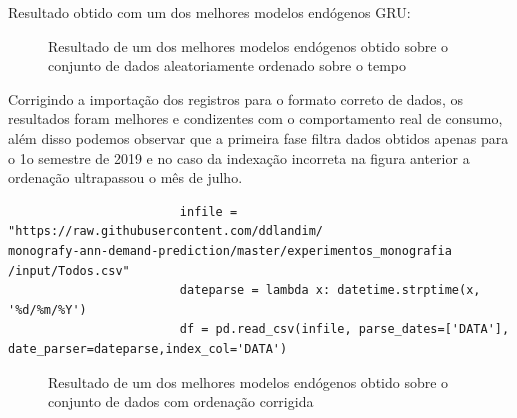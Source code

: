 \documentclass[	12pt, Times, openright, twoside, a4paper, english, brazil]{abntex2}
\begin{document}
    	            Resultado obtido com um dos melhores modelos endógenos GRU:
    	            \begin{figure}[!ht]
                    	\caption{Resultado de um dos melhores modelos endógenos obtido sobre o conjunto de dados aleatoriamente ordenado sobre o tempo \label{fig:pandas_wrong_indexing} }
                    \end{figure}
                    \newpage 
                    Corrigindo a importação dos registros para o formato correto de dados, os resultados foram melhores e condizentes com o comportamento real de consumo, além disso podemos observar que a primeira fase filtra dados obtidos apenas para o 1o semestre de 2019 e no caso da indexação incorreta na figura anterior a ordenação ultrapassou o mês de julho.
                    \begin{lstlisting}
    	                infile = "https://raw.githubusercontent.com/ddlandim/                           monografy-ann-demand-prediction/master/experimentos_monografia                   /input/Todos.csv"
                        dateparse = lambda x: datetime.strptime(x, '%d/%m/%Y')
                        df = pd.read_csv(infile, parse_dates=['DATA'], date_parser=dateparse,index_col='DATA')
    	            \end{lstlisting}
                    \begin{figure}[!ht]
                    	\caption{Resultado de um dos melhores modelos endógenos obtido sobre o conjunto de dados com ordenação corrigida \label{fig:pandas_correct_indexing} }
                    \end{figure}
\end{document}

